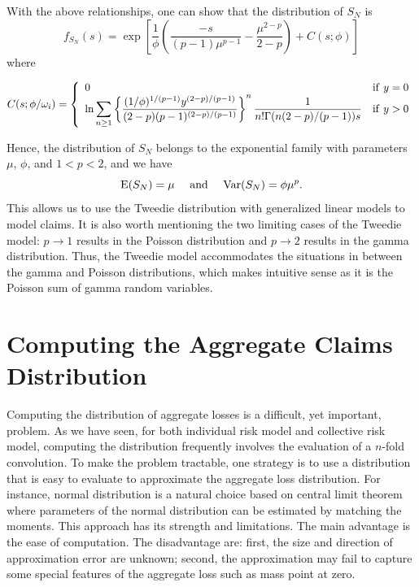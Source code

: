 \documentclass[]{book}
\theoremstyle{definition}
\theoremstyle{definition}
\theoremstyle{definition}
\theoremstyle{remark}
\begin{document}
With the above relationships, one can show that the distribution of
\(S_N\) is
\[f_{S_N}(s)=\exp\left[\frac{1}{\phi}\left(\frac{-s}{(p-1)\mu^{p-1}}-\frac{\mu^{2-p}}{2-p}\right)+C(s;\phi)\right]\]
where

\begin{equation*}
C(s;\phi/\omega_i)=\left\{\begin{array}{ll}
                    \displaystyle 0 & {\rm if}~ y=0 \\
                   \displaystyle \ln \sum\limits_{n\ge 1} \left\{\frac{(1/\phi)^{1/(p-1)}y^{(2-p)/(p-1)}}{(2-p)(p-1)^{(2-p)/(p-1)}}\right\}^{n}\frac{1}{n!\Gamma(n(2-p)/(p-1))s} & {\rm if}~ y>0
                  \end{array}\right.
\end{equation*}

Hence, the distribution of \(S_N\) belongs to the exponential family
with parameters \(\mu\), \(\phi\), and \(1 < p < 2\), and we have
\[{\rm E} (S_N)=\mu~~~~{\rm and}~~~~{\rm Var} (S_N)=\phi\mu^{p}.\] This
allows us to use the Tweedie distribution with generalized linear models
to model claims. It is also worth mentioning the two limiting cases of
the Tweedie model: \(p\rightarrow 1\) results in the Poisson
distribution and \(p\rightarrow 2\) results in the gamma distribution.
Thus, the Tweedie model accommodates the situations in between the gamma
and Poisson distributions, which makes intuitive sense as it is the
Poisson sum of gamma random variables.

\section{Computing the Aggregate Claims
Distribution}\label{computing-the-aggregate-claims-distribution}

Computing the distribution of aggregate losses is a difficult, yet
important, problem. As we have seen, for both individual risk model and
collective risk model, computing the distribution frequently involves
the evaluation of a \(n\)-fold convolution. To make the problem
tractable, one strategy is to use a distribution that is easy to
evaluate to approximate the aggregate loss distribution. For instance,
normal distribution is a natural choice based on central limit theorem
where parameters of the normal distribution can be estimated by matching
the moments. This approach has its strength and limitations. The main
advantage is the ease of computation. The disadvantage are: first, the
size and direction of approximation error are unknown; second, the
approximation may fail to capture some special features of the aggregate
loss such as mass point at zero.
\end{document}
